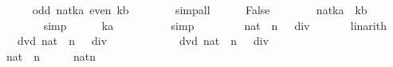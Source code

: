 \begin{isabellebody}
\ \ \ \ \isamarkupfalse%
\ {\isachardoublequoteopen}odd\ {\isacharparenleft}{\isacharparenleft}{}{\isacharcolon}{\isacharcolon}nat{\isacharparenright}{\isacharcircum}ka{\isacharparenright}{\isachardoublequoteclose}\ {\isachardoublequoteopen}even\ {\isacharparenleft}{}{\isacharasterisk}{}{\isacharcircum}kb{\isacharparenright}{\isachardoublequoteclose}\isanewline
\ \ \ \ \ \ \isamarkupfalse%
\ simp{\isacharunderscore}all\isanewline
\ \ \ \ \isamarkupfalse%
\ False\isanewline
\ \ \ \ \ \ \isamarkupfalse%
\ {\isacharbackquoteopen}{\isacharparenleft}{}{\isacharcolon}{\isacharcolon}nat{\isacharparenright}{\isacharcircum}ka\ {\isacharequal}\ {}{\isacharasterisk}{}{\isacharcircum}kb{\isacharbackquoteclose}\isanewline
\ \ \ \ \ \ \isamarkupfalse%
\ simp\isanewline
\ \ \ \ \isamarkupfalse%
\ {\isachardoublequoteopen}{}{\isacharcircum}ka\ {\isasymin}\ {\isacharbraceleft}{\isacharbraceright}{\isachardoublequoteclose}\isanewline
\ \ \ \ \ \ \isamarkupfalse%
\ simp\isanewline
\ \ \isamarkupfalse%
\isanewline
\isanewline
\ \ \isamarkupfalse%
\ {\isachardoublequoteopen}{}\ {\isacharless}\ {\isacharparenleft}{\isacharparenleft}{}{\isacharcolon}{\isacharcolon}nat{\isacharparenright}\ {\isacharcircum}\ n\ {\isacharplus}\ {}{\isacharparenright}\ div\ {}{\isachardoublequoteclose}\isanewline
\ \ \ \ \isamarkupfalse%
\ linarith\isanewline
\isanewline
\ \ \isamarkupfalse%
\ {\isachardoublequoteopen}{\isasymnot}\ {}\ dvd\ {\isacharparenleft}{\isacharparenleft}{\isacharparenleft}{}{\isacharcolon}{\isacharcolon}nat{\isacharparenright}\ {\isacharcircum}\ n\ {\isacharplus}\ {}{\isacharparenright}\ div\ {}\ {\isacharminus}\ {}{\isacharparenright}{\isachardoublequoteclose}\isanewline
\ \ \isamarkupfalse%
{\isacharminus}\isanewline
\ \ \ \ \isamarkupfalse%
\ {\isachardoublequoteopen}{}\ dvd\ {\isacharparenleft}{\isacharparenleft}{}{\isacharcolon}{\isacharcolon}nat{\isacharparenright}\ {\isacharcircum}\ n\ {\isacharplus}\ {}{\isacharparenright}\ div\ {}{\isachardoublequoteclose}\isanewline
\ \ \ \ \isamarkupfalse%
{\isacharminus}\isanewline
\ \ \ \ \ \ \isamarkupfalse%
\ {\isachardoublequoteopen}{\isacharparenleft}{}{\isacharcolon}{\isacharcolon}nat{\isacharparenright}\ {\isacharcircum}\ n\ {\isacharplus}\ {}\ {\isacharequal}\ {\isacharparenleft}{}{\isacharcircum}{}{\isacharparenright}\ {\isacharasterisk}\ {\isacharparenleft}{}{\isacharcolon}{\isacharcolon}nat{\isacharparenright}{\isacharcircum}{\isacharparenleft}n{\isacharminus}{}{\isacharparenright}\ {\isacharplus}\ {}{\isachardoublequoteclose}\isanewline

\end{isabellebody}
